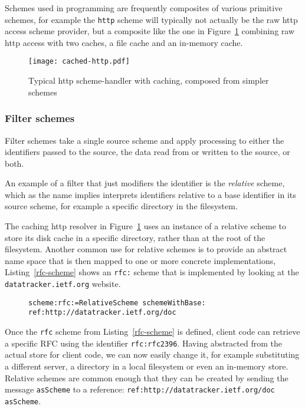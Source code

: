 \documentclass[preprint]{sigplanconf}
\begin{document}
 Schemes used in programming 
are frequently composites of various primitive schemes, for example
the {\tt http} scheme will typically not actually be the raw http access
scheme provider, but a composite like the one in Figure~\ref{fig:http-cached} combining
raw http access with two caches, a file cache and an in-memory cache.


\begin{figure}[htbp]
\centering
\texttt{[image: cached-http.pdf]}
\caption{Typical http scheme-handler with caching, composed from simpler schemes}
\label{fig:http-cached}

\end{figure}


\subsubsection{Filter schemes}
\label{filterschemes}
Filter schemes take a single source scheme and apply processing to either
the identifiers passed to the source,  the data read from or written to the source, or both.

An example of a filter that just modifiers the identifier is the \emph{relative}
scheme, which as the name implies interprets identifiers relative to a base
identifier in its source scheme, for example a specific directory in the
filesystem.  

The caching http resolver in Figure~\ref{fig:http-cached} uses an instance
of a relative scheme to store its disk cache in a specific directory, rather
than at the root of the filesystem.  Another common use for relative schemes
is to provide an abstract name space that is then mapped to one
or more  concrete implementations, Listing~\ref{rfc-scheme} shows
an {\tt rfc:} scheme that is implemented by looking at the {\tt datatracker.ietf.org}
website.


\begin{figure}[htbp]
\begin{lstlisting}[style=numbers,label=rfc-scheme,caption=Defining a custom rfc: scheme.]
scheme:rfc:=RelativeScheme schemeWithBase: ref:http://datatracker.ietf.org/doc
\end{lstlisting}
\end{figure}

Once the {\tt rfc} scheme from Listing~\ref{rfc-scheme} is defined, client code can 
retrieve a specific RFC using the identifier {\tt  rfc:rfc2396}.  Having abstracted
from the actual store for client code, we can now easily change it, for example
substituting a different server, a directory in a local filesystem or even an 
in-memory store.  Relative schemes are common enough that they can be
created by sending the message {\tt asScheme} to a reference: {\tt ref:http://datatracker.ietf.org/doc asScheme}.
\end{document}

